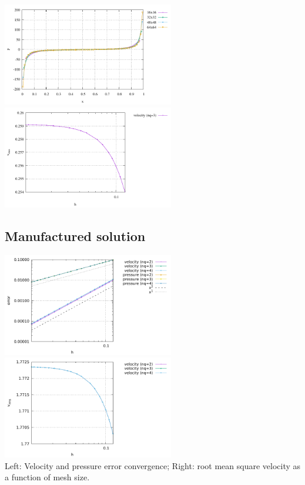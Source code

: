 \begin{center}
\includegraphics[width=7.5cm]{python_codes/fieldstone_80/results/ldc/p_top}
\includegraphics[width=7.5cm]{python_codes/fieldstone_80/results/ldc/vrms}
\end{center}


\subsection*{Manufactured solution}

\begin{center}
\includegraphics[width=7.5cm]{python_codes/fieldstone_80/results/lamich/errors}
\includegraphics[width=7.5cm]{python_codes/fieldstone_80/results/lamich/vrms}\\
{\captionfont Left: Velocity and pressure error convergence; Right: root mean square velocity
as a function of mesh size.}
\end{center}


